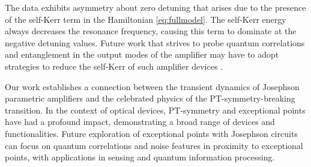 \documentclass[prl,twocolumn,english,superscriptaddress,floatfix,longbibliography]{revtex4-2}
\begin{document}
The data exhibits asymmetry about zero detuning that arises due to the presence of the self-Kerr term in the Hamiltonian \eqref{eq:fullmodel}. The self-Kerr energy always decreases the resonance frequency, causing this term to dominate at the negative detuning values. Future work that strives to probe quantum correlations and entanglement in the output modes of the amplifier \cite{Wang2019} may have to adopt strategies to reduce the self-Kerr of such amplifier devices \cite{Fratini2018}.  %

%

Our work establishes a connection between the transient dynamics of Josephson parametric amplifiers and the celebrated physics of the PT-symmetry-breaking transition.  In the context of optical devices, PT-symmetry and exceptional points have had a profound impact, demonstrating a broad range of devices and functionalities.  Future exploration of exceptional points with Josephson circuits can focus on quantum correlations and noise features in proximity to exceptional points, with applications in sensing and quantum information processing. 
\end{document}

